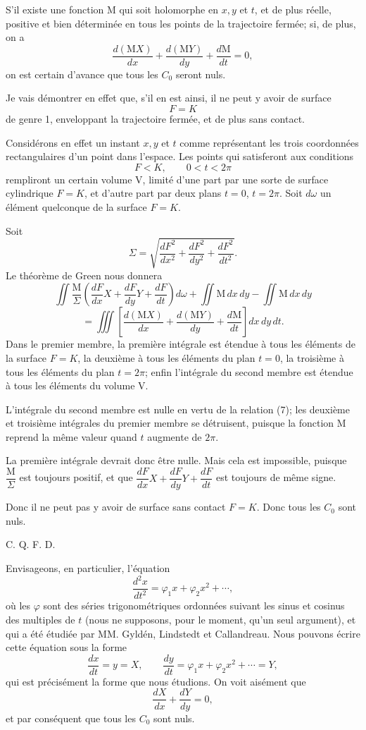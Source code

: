 \documentclass[11pt]{article}
\begin{document}
S’il existe une fonction M qui soit holomorphe en $x,y$ et $t$, et de plus réelle, positive et bien déterminée en tous les points de la trajectoire fermée; si, de plus, on a
\begin{equation}
\frac{d(\mathrm{M}X)}{dx}+\frac{d(\mathrm{M}Y)}{dy}+\frac{d\mathrm{M}}{dt}=0,
\tag{7}
\end{equation}
on est certain d’avance que tous les $C_0$ seront nuls.

Je vais démontrer en effet que, s’il en est ainsi, il ne peut y avoir de surface
\[
F=K
\]
de genre 1, enveloppant la trajectoire fermée, et de plus sans contact.

Considérons en effet un instant $x,y$ et $t$ comme représentant les trois coordonnées rectangulaires d’un point dans l’espace. Les points qui satisferont aux conditions
\[
F<K,
\qquad 0<t<2\pi
\]
rempliront un certain volume V, limité d’une part par une sorte de surface cylindrique $F=K$, et d’autre part par deux plans $t=0$, $t=2\pi$. Soit $d\omega$ un élément quelconque de la surface $F=K$.

Soit
\[
\Sigma=\sqrt{\frac{dF^2}{dx^2}+\frac{dF^2}{dy^2}+\frac{dF^2}{dt^2}}.
\]
Le théorème de Green nous donnera
\[
\iint \frac{\mathrm{M}}{\Sigma}\left(\frac{dF}{dx}X+\frac{dF}{dy}Y+\frac{dF}{dt}\right)d\omega
+\iint \mathrm{M}\,dx\,dy-\iint \mathrm{M}\,dx\,dy
\]
\[
=\iiint\left[\frac{d(\mathrm{M}X)}{dx}+\frac{d(\mathrm{M}Y)}{dy}+\frac{d\mathrm{M}}{dt}\right]dx\,dy\,dt.
\]
Dans le premier membre, la première intégrale est étendue à tous les éléments de la surface $F=K$, la deuxième à tous les éléments du plan $t=0$, la troisième à tous les éléments du plan $t=2\pi$; enfin l’intégrale du second membre est étendue à tous les éléments du volume V.

L’intégrale du second membre est nulle en vertu de la relation (7); les deuxième et troisième intégrales du premier membre se détruisent, puisque la fonction M reprend la même valeur quand $t$ augmente de $2\pi$.

La première intégrale devrait donc être nulle. Mais cela est impossible, puisque $\dfrac{\mathrm{M}}{\Sigma}$ est toujours positif, et que $\dfrac{dF}{dx}X+\dfrac{dF}{dy}Y+\dfrac{dF}{dt}$ est toujours de même signe.

Donc il ne peut pas y avoir de surface sans contact $F=K$. Donc tous les $C_0$ sont nuls.
\begin{flushright}C. Q. F. D.\end{flushright}

Envisageons, en particulier, l’équation
\[
\frac{d^2x}{dt^2}=\varphi_1x+\varphi_2x^2+\cdots,
\]
où les $\varphi$ sont des séries trigonométriques ordonnées suivant les sinus et cosinus des multiples de $t$ (nous ne supposons, pour le moment, qu’un seul argument), et qui a été étudiée par MM. Gyldén, Lindstedt et Callandreau. Nous pouvons écrire cette équation sous la forme
\[
\frac{dx}{dt}=y=X,
\qquad
\frac{dy}{dt}=\varphi_1x+\varphi_2x^2+\cdots=Y,
\]
qui est précisément la forme que nous étudions. On voit aisément que
\[
\frac{dX}{dx}+\frac{dY}{dy}=0,
\]
et par conséquent que tous les $C_0$ sont nuls.
\end{document}
